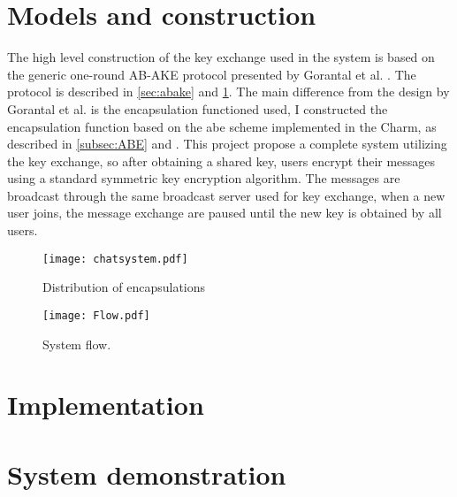 \section{Models and construction}
The high level construction of the key exchange used in the system is based on the generic one-round AB-AKE protocol presented by Gorantal et al. \cite{gorantla2010attribute}. The protocol is described in \ref{sec:abake} and \ref{fig:encapdistr}. The main difference from the design by Gorantal et al. is the encapsulation functioned used, I  constructed the encapsulation function based on the \gls{abe} scheme implemented in the Charm, as described in \ref{subsec:ABE} and \cite{abe_waters09}. This project propose a complete system utilizing the key exchange, so after obtaining a shared key, users encrypt their messages using a standard symmetric key encryption algorithm. The messages are broadcast through the same broadcast server used for key exchange, when a new user joins, the message exchange are paused until the new key is obtained by all users.



\begin{figure}
\centering
\texttt{[image: chatsystem.pdf]}
\caption{Distribution of encapsulations}
\label{fig:encapdistr}
\end{figure}

\begin{figure}
\centering
\texttt{[image: Flow.pdf]}
\caption{System flow.}
\label{fig:flow}
\end{figure}
\section{Implementation}
\section{System demonstration}


